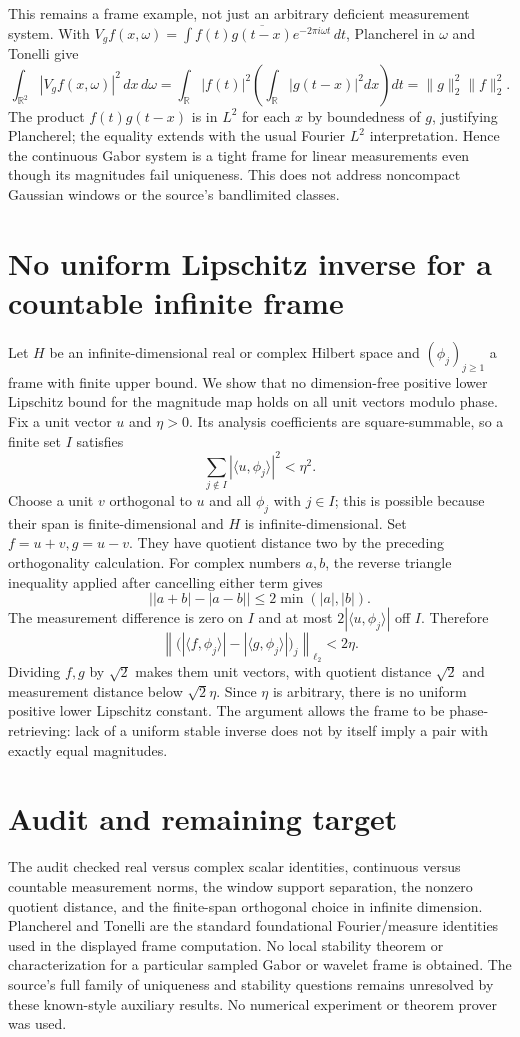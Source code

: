 \documentclass[11pt]{article}
\begin{document}
This remains a frame example, not just an arbitrary deficient
measurement system. With
$V_gf(x,\omega)=\int f(t)\overline{g(t-x)}e^{-2\pi i\omega t}\,dt$,
Plancherel in $\omega$ and Tonelli give
\[
 \int_{\mathbb R^2}|V_gf(x,\omega)|^2\,dx\,d\omega
 =\int_{\mathbb R}|f(t)|^2
       \left(\int_{\mathbb R}|g(t-x)|^2dx\right)dt
 =\|g\|_2^2\|f\|_2^2.
\]
The product $f(t)g(t-x)$ is in $L^2$ for each $x$ by
boundedness of $g$, justifying Plancherel; the equality extends
with the usual Fourier $L^2$ interpretation. Hence the continuous
Gabor system is a tight frame for linear measurements even
though its magnitudes fail uniqueness. This does not address
noncompact Gaussian windows or the source's bandlimited classes.

\section{No uniform Lipschitz inverse for a countable infinite frame}
Let $H$ be an infinite-dimensional real or complex Hilbert space
and $(\phi_j)_{j\ge1}$ a frame with finite upper bound. We show
that no dimension-free positive lower Lipschitz bound for the
magnitude map holds on all unit vectors modulo phase.
Fix a unit vector $u$ and $\eta>0$. Its analysis coefficients
are square-summable, so a finite set $I$ satisfies
\[
 \sum_{j\notin I}|\langle u,\phi_j\rangle|^2<\eta^2.
\]
Choose a unit $v$ orthogonal to $u$ and all $\phi_j$ with
$j\in I$; this is possible because their span is finite-dimensional
and $H$ is infinite-dimensional. Set $f=u+v,g=u-v$.
They have quotient distance two by the preceding orthogonality
calculation. For complex numbers $a,b$, the reverse triangle
inequality applied after cancelling either term gives
\[
 \bigl||a+b|-|a-b|\bigr|\le2\min(|a|,|b|).
\]
The measurement difference is zero on $I$ and at most
$2|\langle u,\phi_j\rangle|$ off $I$. Therefore
\[
 \left\|\bigl(|\langle f,\phi_j\rangle|
 -|\langle g,\phi_j\rangle|\bigr)_j\right\|_{\ell_2}<2\eta.
\]
Dividing $f,g$ by $\sqrt2$ makes them unit vectors, with
quotient distance $\sqrt2$ and measurement distance below
$\sqrt2\eta$. Since $\eta$ is arbitrary, there is no uniform
positive lower Lipschitz constant. The argument allows the
frame to be phase-retrieving: lack of a uniform stable inverse
does not by itself imply a pair with exactly equal magnitudes.

\section{Audit and remaining target}
The audit checked real versus complex scalar identities,
continuous versus countable measurement norms, the window
support separation, the nonzero quotient distance, and the
finite-span orthogonal choice in infinite dimension. Plancherel
and Tonelli are the standard foundational Fourier/measure
identities used in the displayed frame computation. No local
stability theorem or characterization for a particular sampled
Gabor or wavelet frame is obtained. The source's full family
of uniqueness and stability questions remains unresolved by
these known-style auxiliary results. No numerical experiment
or theorem prover was used.
\end{document}
